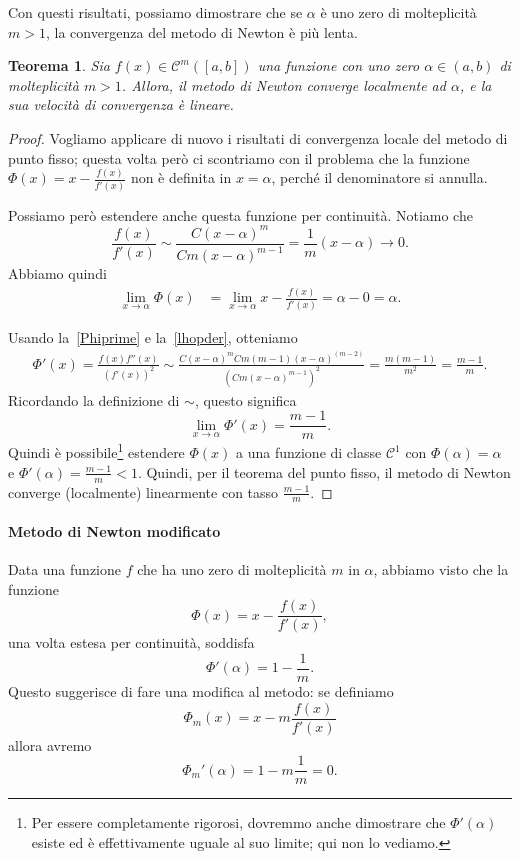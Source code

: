 \documentclass[a4paper]{report}
\newtheorem{theorem}{Teorema}[chapter]
\theoremstyle{definiton}
\theoremstyle{remark}
\begin{document}
Con questi risultati, possiamo dimostrare che se $\alpha$ è uno zero di molteplicità $m>1$, la convergenza del metodo di Newton è più lenta.
\begin{theorem}
    Sia $f(x) \in \mathcal{C}^m([a,b])$ una funzione con uno zero $\alpha \in (a,b)$ di molteplicità $m>1$.
    Allora, il metodo di Newton converge localmente ad $\alpha$, e la sua velocità di convergenza è lineare.
\end{theorem}
\begin{proof}
Vogliamo applicare di nuovo i risultati di convergenza locale del metodo di punto fisso; questa volta però ci scontriamo con il problema che la funzione $\Phi(x) = x - \frac{f(x)}{f'(x)}$ non è definita in $x=\alpha$, perché il denominatore si annulla.

Possiamo però estendere anche questa funzione per continuità. Notiamo che
\[
    \frac{f(x)}{f'(x)} \sim \frac{C(x-\alpha)^m}{Cm(x-\alpha)^{m-1}} = \frac{1}{m}(x-\alpha) \to 0.
\]
Abbiamo quindi
\begin{align*}
    \lim_{x\to\alpha} \Phi(x) &= \lim_{x\to\alpha} x - \frac{f(x)}{f'(x)} = \alpha - 0 = \alpha.
\end{align*}

Usando la~\eqref{Phiprime} e la~\eqref{lhopder}, otteniamo
\begin{align*}
    \Phi'(x) = \frac{f(x)f''(x)}{(f'(x))^2} \sim \frac{C(x-\alpha)^m Cm(m-1)(x-\alpha)^{(m-2)}}{(Cm(x-\alpha)^{m-1})^2} = 
    \frac{m(m-1)}{m^2} = \frac{m-1}{m}.
\end{align*}
Ricordando la definizione di $\sim$, questo significa
\[
    \lim_{x\to\alpha} \Phi'(x) = \frac{m-1}{m}.
\]
Quindi è possibile\footnote{Per essere completamente rigorosi, dovremmo anche dimostrare che $\Phi'(\alpha)$ esiste ed è effettivamente uguale al suo limite; qui non lo vediamo.} estendere $\Phi(x)$ a una funzione di classe $\mathcal{C}^1$ con $\Phi(\alpha)=\alpha$ e $\Phi'(\alpha) = \frac{m-1}{m} < 1$. Quindi, per il teorema del punto fisso, il metodo di Newton converge (localmente) linearmente con tasso $\frac{m-1}{m}$.
\end{proof}

\paragraph{Metodo di Newton modificato} Data una funzione $f$ che ha uno zero di molteplicità $m$ in $\alpha$, abbiamo visto che la funzione
\[
    \Phi(x) = x - \frac{f(x)}{f'(x)},
\]
una volta estesa per continuità, soddisfa
\[
    \Phi'(\alpha) = 1 - \frac{1}{m}.
\]
Questo suggerisce di fare una modifica al metodo: se definiamo
\[
    \Phi_m(x) = x - m \frac{f(x)}{f'(x)}
\]
allora avremo
\[
    \Phi_m'(\alpha) = 1 - m\frac{1}{m} = 0.
\]
\end{document}
